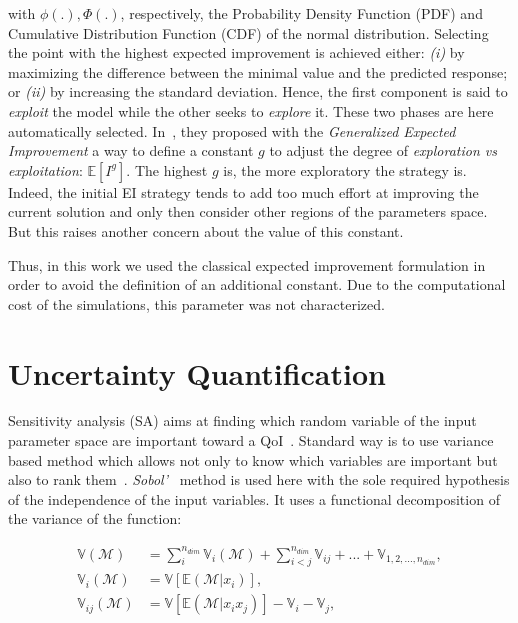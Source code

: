 \noindent with $\phi(.), \Phi(.)$, respectively, the Probability Density Function (PDF) and Cumulative Distribution Function (CDF) of the normal distribution. Selecting the point with the highest expected improvement is achieved either: \emph{(i)} by maximizing the difference between the minimal value and the predicted response; or \emph{(ii)} by increasing the standard deviation. Hence, the first component is said to \emph{exploit} the model while the other seeks to \emph{explore} it. These two phases are here automatically selected. In~\cite{schonlau1998}, they proposed with the \emph{Generalized Expected Improvement} a way to define a constant $g$ to adjust the degree of \emph{exploration vs exploitation}: $\mathbb{E}[I^g]$. The highest $g$ is, the more exploratory the strategy is. Indeed, the initial EI strategy tends to add too much effort at improving the current solution and only then consider other regions of the parameters space. But this raises another concern about the value of this constant.

Thus, in this work we used the classical expected improvement formulation in order to avoid the definition of an additional constant. Due to the computational cost of the simulations, this parameter was not characterized.


\section{Uncertainty Quantification}
\label{sec:uq}

Sensitivity analysis (SA) aims at finding which random variable of the input parameter space are important toward a QoI~\cite{iooss2016}. Standard way is to use variance based method which allows not only to know which variables are important but also to rank them~\cite{ferretti2016}. \textit{Sobol'}~\cite{Sobol1993} method is used here with the sole required hypothesis of the independence of the input variables. It uses a functional decomposition of the variance of the function:

\begin{align}
\mathbb{V}(\mathcal{M}) &= \sum_{i}^{n_{dim}} \mathbb{V}_i (\mathcal{M}) + \sum_{i<j}^{n_{dim}}\mathbb{V}_{ij} + ... + \mathbb{V}_{1,2,...,n_{dim}},\\
\mathbb{V}_i(\mathcal{M}) &= \mathbb{\mathbb{V}}[\mathbb{E}(\mathcal{M}|x_i)],\nonumber\\
\mathbb{V}_{ij}(\mathcal{M}) &= \mathbb{\mathbb{V}}[\mathbb{E}(\mathcal{M}|x_i x_j)] - \mathbb{V}_i - \mathbb{V}_j,\nonumber
\end{align}

